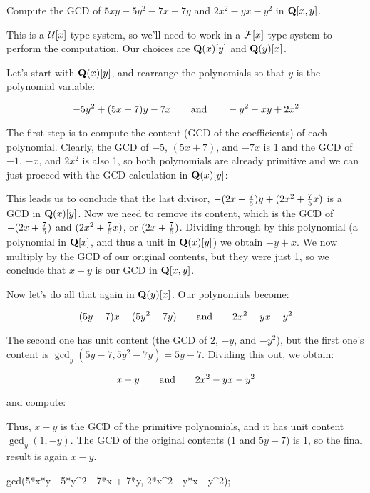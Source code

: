 \endexample

\vfill\eject

\example

Compute the GCD of $5xy-5y^2-7x+7y$ and $2x^2-yx-y^2$ in ${\bf Q}[x,y]$.

This is a ${\cal U}[x]$-type system, so we'll need to work in a
${\cal F}[x]$-type system to perform the computation.  Our choices
are ${\bf Q}(x)[y]$ and ${\bf Q}(y)[x]$.

Let's start with ${\bf Q}(x)[y]$, and rearrange the polynomials
so that $y$ is the polynomial variable:

$$-5y^2+(5x+7)y-7x {\rm\qquad and\qquad} -y^2-xy+2x^2$$

The first step is to compute the content (GCD of the coefficients) of
each polynomial.  Clearly, the GCD of $-5$, $(5x+7)$, and $-7x$ is 1
and the GCD of $-1$, $-x$, and $2x^2$ is also 1, so both polynomials
are already primitive and we can just proceed with the GCD calculation
in ${\bf Q}(x)[y]$:



This leads us to conclude that the last divisor,
$-(2x+{7\over5})y+(2x^2+{7\over5}x)$ is a GCD in ${\bf Q}(x)[y]$.  Now
we need to remove its content, which is the GCD of $-(2x+{7\over5})$
and $(2x^2+{7\over5}x)$, or $(2x+{7\over5})$.  Dividing through by
this polynomial (a polynomial in ${\bf Q}[x]$, and thus a unit in
${\bf Q}(x)[y]$) we obtain $-y+x$.  We now multiply by the GCD of our
original contents, but they were just 1, so we conclude that $x-y$
is our GCD in ${\bf Q}[x,y]$.

Now let's do all that again in ${\bf Q}(y)[x]$.  Our polynomials become:

$$(5y-7)x-(5y^2-7y) {\rm\qquad and\qquad} 2x^2-yx-y^2$$

The second one has unit content (the GCD of $2$, $-y$, and $-y^2$),
but the first one's content is $\gcd_y(5y-7,5y^2-7y)=5y-7$.
Dividing this out, we obtain:

$$x-y {\rm\qquad and\qquad} 2x^2-yx-y^2$$

and compute:



Thus, $x-y$ is the GCD of the primitive polynomials, and it has unit
content $\gcd_y(1,-y)$.  The GCD of the original contents
($1$ and $5y-7$) is 1, so the final result is again $x-y$.

\begin{maximacode}
gcd(5*x*y - 5*y^2 - 7*x + 7*y,
    2*x^2 - y*x - y^2);
\end{maximacode}

